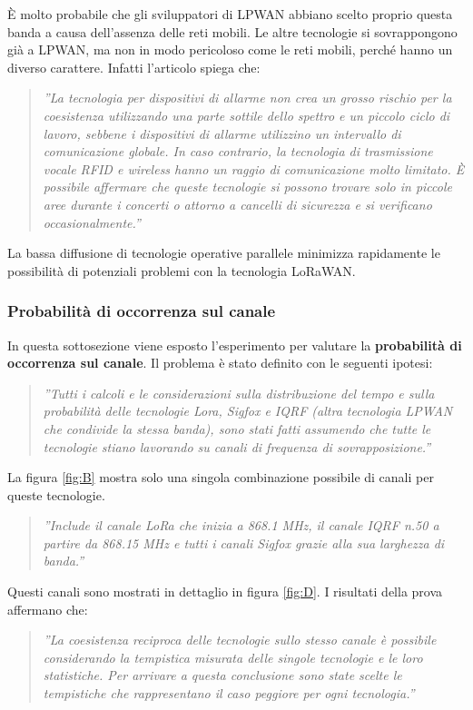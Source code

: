 \documentclass[a4paper]{report} %
\begin{document}
È molto probabile che gli sviluppatori di LPWAN abbiano scelto proprio questa banda a causa dell'assenza delle reti mobili. Le altre tecnologie si sovrappongono già a LPWAN, ma non in modo pericoloso come le reti mobili, perché hanno un diverso carattere. Infatti l'articolo \cite{art:rif.46} spiega che:
\begin{quote}
	\textit{''La tecnologia per dispositivi di allarme non crea un grosso rischio per la coesistenza utilizzando una parte sottile dello spettro e un piccolo ciclo di lavoro, sebbene i dispositivi di allarme utilizzino un intervallo di comunicazione globale. In caso contrario, la tecnologia di trasmissione vocale RFID e wireless hanno un raggio di comunicazione molto limitato. È possibile affermare che queste tecnologie si possono trovare solo in piccole aree durante i concerti o attorno a cancelli di sicurezza e si verificano occasionalmente.''}
\end{quote}
La bassa diffusione di tecnologie operative parallele minimizza rapidamente le possibilità di potenziali problemi con la tecnologia LoRaWAN.

\subsubsection{Probabilità di occorrenza sul canale}
In questa sottosezione viene esposto l'esperimento \cite{art:rif.46} per valutare la \textbf{probabilità di occorrenza sul canale}. Il problema è stato definito con le seguenti ipotesi:
\begin{quote}
	\textit{''Tutti i calcoli e le considerazioni sulla distribuzione del tempo e sulla probabilità delle tecnologie Lora, Sigfox e IQRF (altra tecnologia LPWAN che condivide la stessa banda), sono stati fatti assumendo che tutte le tecnologie stiano lavorando su canali di frequenza di sovrapposizione.''}
\end{quote}
La figura \ref{fig:B} mostra solo una singola combinazione possibile di canali per queste tecnologie. 
\begin{quote}
	\textit{''Include il canale LoRa che inizia a 868.1 MHz, il canale IQRF n.50 a partire da 868.15 MHz e tutti i canali Sigfox grazie alla sua larghezza di banda.''}
\end{quote}
Questi canali sono mostrati in dettaglio in figura \ref{fig:D}. I risultati della prova affermano che:
\begin{quote}
	\textit{''La coesistenza reciproca delle tecnologie sullo stesso canale è possibile considerando la tempistica misurata delle singole tecnologie e le loro statistiche. Per arrivare a questa conclusione sono state scelte le tempistiche che rappresentano il caso peggiore per ogni tecnologia.''}
\end{quote}
\end{document}
